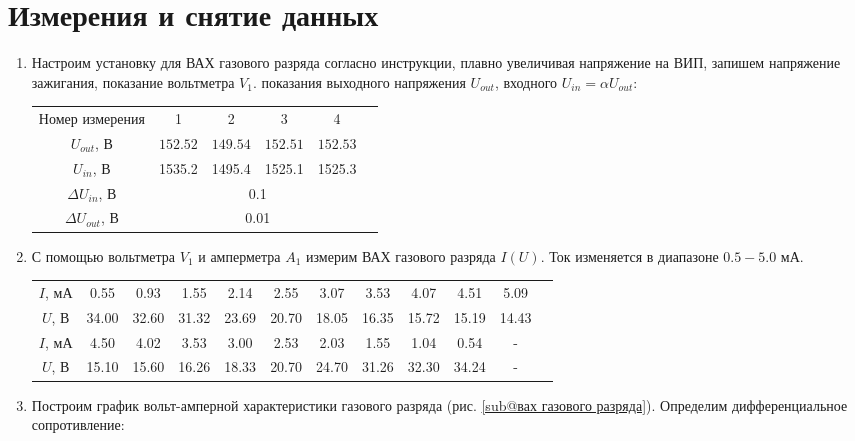 \documentclass[a4paper, 12pt]{article}
\begin{document}
\section*{Измерения и снятие данных}
\begin{enumerate}
    \item Настроим установку для ВАХ газового разряда согласно инструкции, плавно увеличивая напряжение на ВИП, запишем напряжение
    зажигания, показание вольтметра $V_{1}$. показания выходного напряжения $U_{out}$, входного $U_{in} = \alpha U_{out}$:
    \begin{center}
        \begin{tabular}{|c|c|c|c|c|c|}
            \hline
            Номер измерения & 1 & 2 & 3 & 4\\
            $U_{out}$, В & $152.52$ & $149.54$ & $152.51$ & $152.53$\\
            $U_{in}$, В & 1535.2 & 1495.4 & 1525.1 & 1525.3\\
            \hline
            $\Delta U_{in}$, В & \multicolumn{4}{|c|}{0.1}\\
            $\Delta U_{out}$, В & \multicolumn{4}{|c|}{0.01}\\
            \hline
        \end{tabular}
    \end{center}
    \item С помощью вольтметра $V_{1}$ и амперметра $A_{1}$ измерим ВАХ газового разряда $I(U)$. Ток изменяется в диапазоне $0.5 - 5.0$ мА.
    \begin{center}
        \begin{tabular}{|c|c|c|c|c|c|c|c|c|c|c|c|}
            \hline
            $I$, мА & 0.55 & 0.93 & 1.55 & 2.14 & 2.55 & 3.07 & 3.53 & 4.07 & 4.51 & 5.09\\
            $U$, В & 34.00 & 32.60 & 31.32 & 23.69 & 20.70 & 18.05 & 16.35 & 15.72 & 15.19 & 14.43\\
            \hline
            $I$, мА & 4.50 & 4.02 & 3.53 & 3.00 & 2.53 & 2.03 & 1.55 & 1.04 & 0.54 & -\\
            $U$, В & 15.10 & 15.60 & 16.26 & 18.33 & 20.70 & 24.70 & 31.26 & 32.30 & 34.24 & -\\
            \hline
        \end{tabular}
    \end{center}
    \item Построим график вольт-амперной характеристики газового разряда (рис. \ref{sub@вах газового разряда}). Определим дифференциальное сопротивление:

\end{enumerate}
\end{document}
